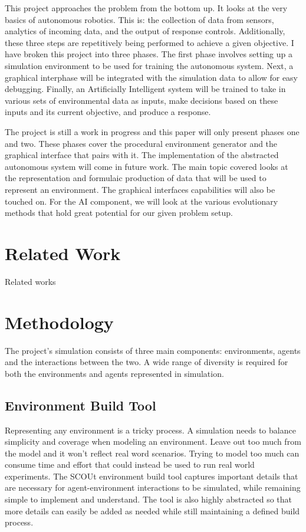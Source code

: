\documentclass[]{report}
\begin{document}
This project approaches the problem from the bottom up.
It looks at the very basics of autonomous robotics.
This is: the collection of data from sensors, analytics of incoming data, and the output of response controls.
Additionally, these three steps are repetitively being performed to achieve a given objective.
I have broken this project into three phases.
The first phase involves setting up a simulation environment to be used for training the autonomous system.
Next, a graphical interphase will be integrated with the simulation data to allow for easy debugging.
Finally, an Artificially Intelligent system will be trained to take in various sets of environmental data as inputs, make decisions based on these inputs and its current objective, and produce a response.

The project is still a work in progress and this paper will only present phases one and two.
These phases cover the procedural environment generator and the graphical interface that pairs with it.
The implementation of the abstracted autonomous system will come in future work.
The main topic covered looks at the representation and formulaic production of data that will be used to represent an environment.
The graphical interfaces capabilities will also be touched on.
For the AI component, we will look at the various evolutionary methods that hold great potential for our given problem setup.



\chapter{Related Work}
Related works



\chapter{Methodology}
The project’s simulation consists of three main components: environments, agents and the interactions between the two.
A wide range of diversity is required for both the environments and agents represented in simulation.


\section{Environment Build Tool}
Representing any environment is a tricky process.
A simulation needs to balance simplicity and coverage when modeling an environment.
Leave out too much from the model and it won’t reflect real word scenarios.
Trying to model too much can consume time and effort that could instead be used to run real world experiments.
The SCOUt environment build tool captures important details that are necessary for agent-environment interactions to be simulated, while remaining simple to implement and understand.
The tool is also highly abstracted so that more details can easily be added as needed while still maintaining a defined build process.
\end{document}
